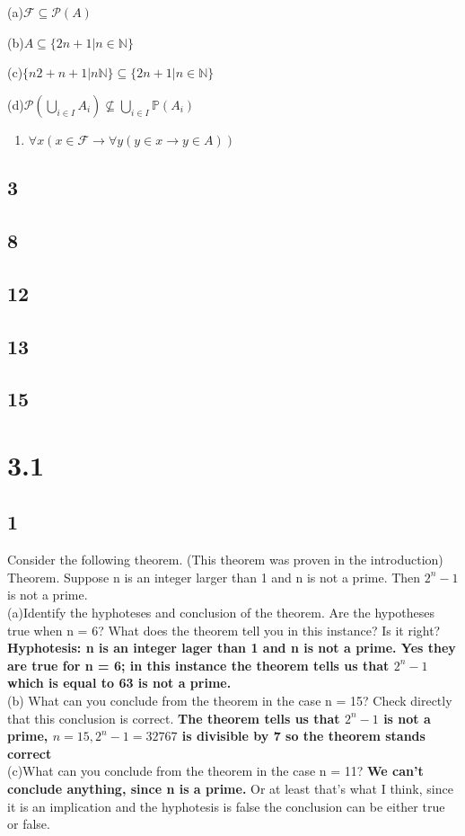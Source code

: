 \documentclass{article}
\begin{document}
(a)$\mathcal{F} \subseteq \mathscr{P}(A)$

(b)$A \subseteq \{2n+1 | n \in \mathbb{N} \}$

(c)$\{n2 + n +1 | n \mathbb{N}\}\subseteq \{ 2n+1 | n \in \mathbb{N}\}$

(d)$\mathscr{P} (\bigcup_{i \in I} A_{i})\nsubseteq \bigcup_{i \in I} \mathbb{P}(A_{i})$

\begin{enumerate}[label=(\alph*)]
    \item 
    $\forall x(x\in \mathcal{F} \rightarrow \forall y (y \in x \rightarrow y \in A))$
\end{enumerate}
\subsection{3}
\subsection{8}
\subsection{12}
\subsection{13}
\subsection{15}
\newpage
\section{3.1}
\subsection{1}
Consider the following theorem. (This theorem was proven in the introduction)
\\
Theorem. Suppose n is an integer larger than 1 and n is not a prime.  Then $2^n - 1$ is not a prime.
\\
(a)Identify the hyphoteses and conclusion of the theorem. Are the hypotheses true when n = 6? What does the theorem tell you in this instance? Is it right?
\\
\textbf{Hyphotesis:
n is an integer lager than 1 and n is not a prime. Yes they are true for n = 6; in this instance the theorem tells us that $2^n - 1 $ which is equal to 63 is not a prime.}
\\
(b) What can you conclude from the theorem in the case n = 15? Check directly that this conclusion is correct.
\textbf{The theorem tells us that $2^n - 1$ is not a prime, $n=15, 2^n - 1 = 32767$ is divisible by 7 so the theorem stands correct}
\\
(c)What can you conclude from the theorem in the case n = 11?
\textbf{We can't conclude anything, since n is a prime.} Or at least that's what I think, since it is an implication and the hyphotesis is false the conclusion can be either true or false.
\end{document}
